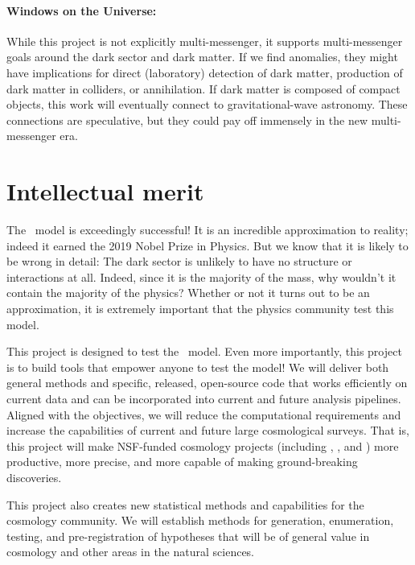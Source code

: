 \documentclass[12pt, fullpage, letterpaper]{article}
\begin{document}
\paragraph{Windows on the Universe:}
While this project is not explicitly multi-messenger, it supports
multi-messenger goals around the dark sector and dark matter. If we
find anomalies, they might have implications for direct (laboratory)
detection of dark matter, production of dark matter in colliders, or
annihilation. If dark matter is composed of compact objects, this work
will eventually connect to gravitational-wave astronomy. These
connections are speculative, but they could pay off immensely in the
new multi-messenger era.

\section{Intellectual merit}

The \LCDM\ model is exceedingly successful!
It is an incredible approximation to reality; indeed it earned the 2019 Nobel Prize in Physics.
But we know that it is likely to be wrong in detail:
The dark sector is unlikely to have no structure or interactions at all.
Indeed, since it is the majority of the mass, why wouldn't it contain the majority
of the physics?
Whether or not it turns out to be an approximation, it is extremely important that
the physics community test this model.

This project is designed to test the \LCDM\ model.
Even more importantly, this project is to build tools that empower anyone to test the model!
We will deliver both general methods and specific, released,
open-source code that works efficiently on current data and can be
incorporated into current and future analysis pipelines.
Aligned with the  objectives, we will reduce the computational requirements and
increase the capabilities of current and future large cosmological surveys.
That is, this project will make NSF-funded cosmology projects (including
\SDSSIV, \DESI, and \LSST) more productive, more precise, and more
capable of making ground-breaking discoveries.

This project also creates new statistical methods and capabilities for the 
cosmology community.
We will establish methods for generation, enumeration, testing, and pre-registration of hypotheses that
will be of general value in cosmology and other areas in the natural
sciences.
\end{document}
